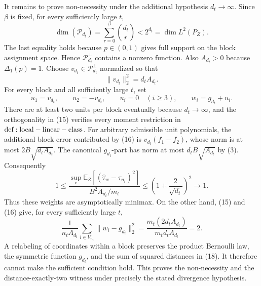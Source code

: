It remains to prove non-necessity under the additional hypothesis \(d_t\to\infty\). Since \(\beta\) is fixed, for every sufficiently large \(t\),
\[
\dim(\mathcal P_{d_t})=\sum_{r=0}^{\beta}\binom{d_t}{r}<2^{d_t}=\dim L^2(P_Z).
\tag{14}
\]
The last equality holds because \(p\in(0,1)\) gives full support on the block assignment space. Hence \(\mathcal P_{d_t}^{\perp}\) contains a nonzero function. Also \(A_{d_t}>0\) because \(\Delta_1(p)=1\). Choose \(v_{d_t}\in\mathcal P_{d_t}^{\perp}\) normalized so that
\[
\lVert v_{d_t}\rVert_2^2=d_tA_{d_t}.
\tag{15}
\]
For every block and all sufficiently large \(t\), set
\[
u_1=v_{d_t},\qquad u_2=-v_{d_t},\qquad u_i=0\quad(i\ge3),
\qquad w_i=g_{d_t}+u_i.
\tag{16}
\]
There are at least two units per block eventually because \(d_t\to\infty\), and the orthogonality in (15) verifies every moment restriction in \({\rm def:local-linear-class}\). For arbitrary admissible unit polynomials, the additional block error contributed by (16) is \(v_{d_t}(f_1-f_2)\), whose norm is at most \(2B\sqrt{d_tA_{d_t}}\). The canonical \(g_{d_t}\)-part has norm at most \(d_tB\sqrt{A_{d_t}}\) by (3). Consequently
\[
1\le
\frac{\sup_c\mathbb E_Z[(\widehat\tau_w-\tau_{n_t})^2]}
{B^2A_{d_t}/m_t}
\le\left(1+\frac{2}{\sqrt{d_t}}\right)^2\longrightarrow1.
\tag{17}
\]
Thus these weights are asymptotically minimax. On the other hand, (15) and (16) give, for every sufficiently large \(t\),
\[
\frac{1}{n_tA_{d_t}}\sum_{i\in V_{n_t}}
\lVert w_i-g_{d_t}\rVert_2^2
=\frac{m_t(2d_tA_{d_t})}{m_td_tA_{d_t}}=2.
\tag{18}
\]
A relabeling of coordinates within a block preserves the product Bernoulli law, the symmetric function \(g_{d_t}\), and the sum of squared distances in (18). It therefore cannot make the sufficient condition hold. This proves the non-necessity and the distance-exactly-two witness under precisely the stated divergence hypothesis.
